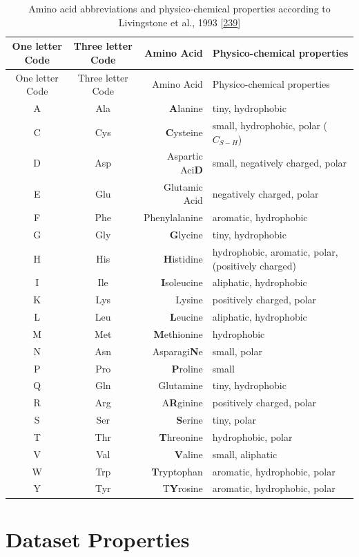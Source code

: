 \documentclass[11pt,a4paper,twoside]{book}
\newcommand{\blandscape}{\begin{landscape}}
\newcommand{\elandscape}{\end{landscape}}
\theoremstyle{definition}
\theoremstyle{definition}
\theoremstyle{remark}
\begin{document}
\blandscape

\begin{longtable}[]{@{}ccrl@{}}
\caption{\label{tab:amino-acid-prop} Amino acid abbreviations and
physico-chemical properties according to Livingstone et al., 1993
{[}\protect\hyperlink{ref-Livingstone1993}{239}{]}}\tabularnewline
\toprule
One letter Code & Three letter Code & Amino Acid & Physico-chemical
properties\tabularnewline
\midrule
\endfirsthead
\toprule
One letter Code & Three letter Code & Amino Acid & Physico-chemical
properties\tabularnewline
\midrule
\endhead
A & Ala & \textbf{A}lanine & tiny, hydrophobic\tabularnewline
C & Cys & \textbf{C}ysteine & small, hydrophobic, polar
(\(C_{S-H}\))\tabularnewline
D & Asp & Aspartic Aci\textbf{D} & small, negatively charged,
polar\tabularnewline
E & Glu & Glutamic Acid & negatively charged, polar\tabularnewline
F & Phe & Phenylalanine & aromatic, hydrophobic\tabularnewline
G & Gly & \textbf{G}lycine & tiny, hydrophobic\tabularnewline
H & His & \textbf{H}istidine & hydrophobic, aromatic, polar, (positively
charged)\tabularnewline
I & Ile & \textbf{I}soleucine & aliphatic, hydrophobic\tabularnewline
K & Lys & Lysine & positively charged, polar\tabularnewline
L & Leu & \textbf{L}eucine & aliphatic, hydrophobic\tabularnewline
M & Met & \textbf{M}ethionine & hydrophobic\tabularnewline
N & Asn & Asparagi\textbf{N}e & small, polar\tabularnewline
P & Pro & \textbf{P}roline & small\tabularnewline
Q & Gln & Glutamine & tiny, hydrophobic\tabularnewline
R & Arg & A\textbf{R}ginine & positively charged, polar\tabularnewline
S & Ser & \textbf{S}erine & tiny, polar\tabularnewline
T & Thr & \textbf{T}hreonine & hydrophobic, polar\tabularnewline
V & Val & \textbf{V}aline & small, aliphatic\tabularnewline
W & Trp & \textbf{T}ryptophan & aromatic, hydrophobic,
polar\tabularnewline
Y & Tyr & T\textbf{Y}rosine & aromatic, hydrophobic,
polar\tabularnewline
\bottomrule
\end{longtable}

\elandscape

\chapter{Dataset Properties}\label{dataset-properties}
\end{document}
